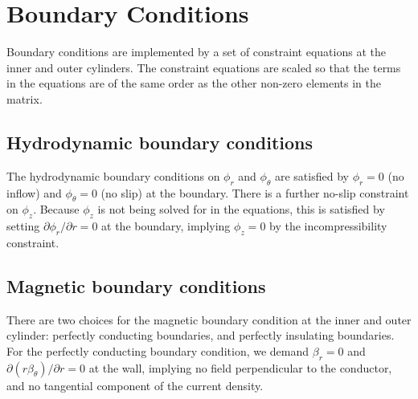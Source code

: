 \documentclass[letterpaper]{article}
\begin{document}
\section{Boundary Conditions}

Boundary conditions are implemented by a set of constraint equations
at the inner and outer cylinders. The constraint equations are scaled
so that the terms in the equations are of the same order as the other
non-zero elements in the matrix.

\subsection{Hydrodynamic boundary conditions}

The hydrodynamic boundary conditions on $\phi_r$ and $\phi_\theta$ are
satisfied by $\phi_r = 0$ (no inflow) and $\phi_\theta = 0$ (no slip)
at the boundary.  There is a further no-slip constraint on $\phi_z$.
Because $\phi_z$ is not being solved for in the equations, this is
satisfied by setting $\partial \phi_r/\partial r = 0$ at the boundary,
implying $\phi_z=0$ by the incompressibility constraint.

\subsection{Magnetic boundary conditions}

There are two choices for the magnetic boundary condition at the inner
and outer cylinder: perfectly conducting boundaries, and perfectly
insulating boundaries.  For the perfectly conducting boundary
condition, we demand $\beta_r = 0$ and $\partial (r
\beta_\theta)/\partial r = 0$ at the wall, implying no field
perpendicular to the conductor, and no tangential component of the
current density.
\end{document}
